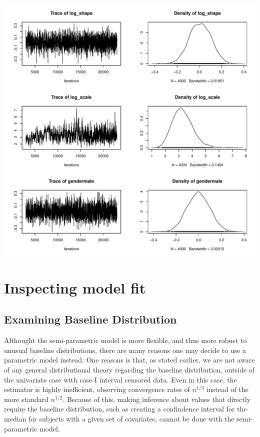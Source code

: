 \documentclass[a4paper]{article}
\begin{document}
\begin{Schunk}
\end{Schunk}
\includegraphics{icenReg-020}

\section{Inspecting model fit}

\subsection{Examining Baseline Distribution}
  
Althought the semi-parametric model is more flexible, and thus more robust to unusual baseline distributions, there are many reasons one may decide to use a parametric model instead. One reasons is that, as stated earlier, we are not aware of any general distributional theory regarding the baseline distribution, outside of the univariate case with case I interval censored data. Even in this case, the estimator is highly inefficient, observing convergence rates of $n^{1/3}$ instead of the more standard $n^{1/2}$. Because of this, making inference about values that directly require the baseline distribution, such as creating a confindence interval for the median for subjects with a given set of covariates, cannot be done with the semi-parametric model. 
  
\end{document}
